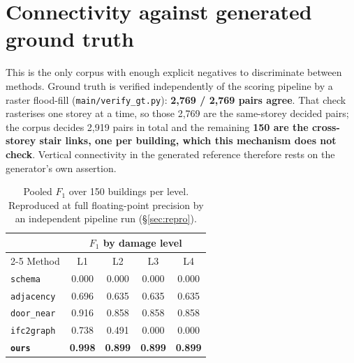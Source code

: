 \documentclass[11pt,a4paper]{article}
\newcommand{\code}[1]{\texttt{\small #1}}
\begin{document}
\section{Connectivity against generated ground truth}

This is the only corpus with enough explicit negatives to discriminate between
methods. Ground truth is verified independently of the scoring pipeline by a
raster flood-fill (\code{main/verify\_gt.py}): \textbf{2{,}769 / 2{,}769 pairs
agree}. That check rasterises one storey at a time, so those 2{,}769 are the
same-storey decided pairs; the corpus decides 2{,}919 pairs in total and the
remaining \textbf{150 are the cross-storey stair links, one per building, which
this mechanism does not check}. Vertical connectivity in the generated
reference therefore rests on the generator's own assertion.

\begin{table}[ht]
\centering
\small
\begin{tabular}{lcccc}
\toprule
& \multicolumn{4}{c}{$F_1$ by damage level} \\
\cmidrule(l){2-5}
Method & L1 & L2 & L3 & L4 \\
\midrule
\code{schema}    & 0.000 & 0.000 & 0.000 & 0.000 \\
\code{adjacency} & 0.696 & 0.635 & 0.635 & 0.635 \\
\code{door\_near} & 0.916 & 0.858 & 0.858 & 0.858 \\
\code{ifc2graph} & 0.738 & 0.491 & 0.000 & 0.000 \\
\textbf{\code{ours}} & \textbf{0.998} & \textbf{0.899} & \textbf{0.899} & \textbf{0.899} \\
\bottomrule
\end{tabular}
\caption{Pooled $F_1$ over 150 buildings per level. Reproduced at full
floating-point precision by an independent pipeline run (\S\ref{sec:repro}).}
\end{table}
\end{document}
